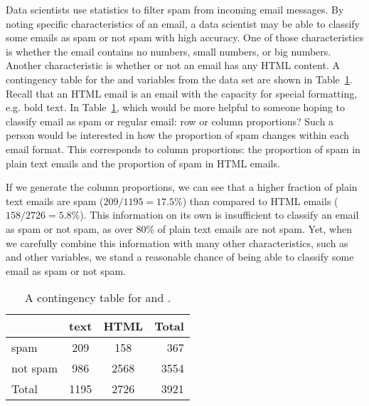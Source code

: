 \begin{example}{Data scientists use statistics to filter spam from incoming email messages. By noting specific characteristics of an email, a data scientist may be able to classify some emails as spam or not spam with high accuracy. One of those characteristics is whether the email contains no numbers, small numbers, or big numbers. Another characteristic is whether or not an email has any HTML content. A contingency table for the  and  variables from the  data set are shown in Table~\ref{emailSpamHTMLTableTotals}. Recall that an HTML email is an email with the capacity for special formatting, e.g. bold text. In Table~\ref{emailSpamHTMLTableTotals}, which would be more helpful to someone hoping to classify email as spam or regular email: row or column proportions?} \label{weighingRowColumnProportions}
Such a person would be interested in how the proportion of spam changes within each email format. This corresponds to column proportions: the proportion of spam in plain text emails and the proportion of spam in HTML emails.

If we generate the column proportions, we can see that a higher fraction of plain text emails are spam ($209/1195 = 17.5\%$) than compared to HTML emails ($158/2726 = 5.8\%$). This information on its own is insufficient to classify an email as spam or not spam, as over 80\% of plain text emails are not spam. Yet, when we carefully combine this information with many other characteristics, such as  and other variables, we stand a reasonable chance of being able to classify some email as spam or not spam. 
\end{example}

\begin{table}[ht]
\centering
\begin{tabular}{l cc r}
  \hline
 & text & HTML & Total \\ 
  \hline
spam & 209 & 158 & 367 \\ 
not spam & 986 & 2568 & 3554 \\ 
   \hline
Total & 1195 & 2726 & 3921 \\
   \hline
\end{tabular}
\caption{A contingency table for  and .}
\label{emailSpamHTMLTableTotals}
\end{table}

